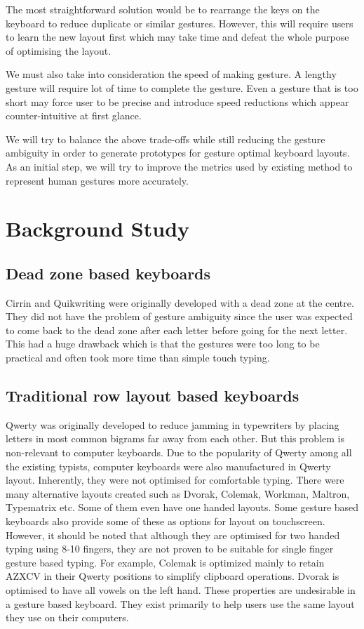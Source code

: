 \documentclass[MTech]{iitmdiss}
\begin{document}
The most straightforward solution would be to rearrange the keys on the keyboard to reduce duplicate or similar gestures. However, this will require users to learn the new layout first which may take time and defeat the whole purpose of optimising the layout.


We must also take into consideration the speed of making gesture. A lengthy gesture will require lot of time to complete the gesture. Even a gesture that is too short may force user to be precise and introduce speed reductions which appear counter-intuitive at first glance.


We will try to balance the above trade-offs while still reducing the gesture ambiguity in order to generate prototypes for gesture optimal keyboard layouts. As an initial step, we will try to improve the metrics used by existing method to represent human gestures more accurately.

\chapter{Background Study}
\section{Dead zone based keyboards}
Cirrin \cite{cirrin} and Quikwriting \cite{quicwriting} were originally developed with a dead zone at the centre. They did not have the problem of gesture ambiguity since the user was expected to come back to the dead zone after each letter before going for the next letter. This had a huge drawback which is that the gestures were too long to be practical and often took more time than simple touch typing.

\section{Traditional row layout based keyboards}
Qwerty was originally developed to reduce jamming in typewriters by placing letters in most common bigrams far away from each other. But this problem is non-relevant to computer keyboards. Due to the popularity of Qwerty among all the existing typists, computer keyboards were also manufactured in Qwerty layout. Inherently, they were not optimised for comfortable typing. There were many alternative layouts created such as Dvorak, Colemak, Workman, Maltron, Typematrix etc. Some of them even have one handed layouts. Some gesture based keyboards also provide some of these as options for layout on touchscreen. However, it should be noted that although they are optimised for two handed typing using 8-10 fingers, they are not proven to be suitable for single finger gesture based typing. For example, Colemak is optimized mainly to retain AZXCV in their Qwerty positions to simplify clipboard operations. Dvorak is optimised to have all vowels on the left hand. These properties are undesirable in a gesture based keyboard. They exist primarily to help users use the same layout they use on their computers.
\end{document}
